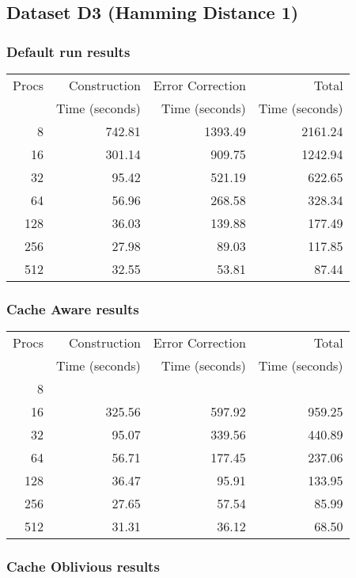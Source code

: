 \documentclass[integrals, nointegrals, article, 12pt, a4paper]{article}
\begin{document}
\subsection{Dataset D3 (Hamming Distance 1)}
\label{sec-3-4}
\subsubsection{Default run results}
\label{sec-3-4-1}

\begin{center}
\begin{tabular}{rrrr}
\hline
Procs & Construction & Error Correction & Total\\
 & Time (seconds) & Time (seconds) & Time (seconds)\\
\hline
8 & 742.81 & 1393.49 & 2161.24\\
16 & 301.14 & 909.75 & 1242.94\\
32 & 95.42 & 521.19 & 622.65\\
64 & 56.96 & 268.58 & 328.34\\
128 & 36.03 & 139.88 & 177.49\\
256 & 27.98 & 89.03 & 117.85\\
512 & 32.55 & 53.81 & 87.44\\
\hline
\end{tabular}
\end{center}
\subsubsection{Cache Aware results}
\label{sec-3-4-2}

\begin{center}
\begin{tabular}{rrrr}
\hline
Procs & Construction & Error Correction & Total\\
 & Time (seconds) & Time (seconds) & Time (seconds)\\
\hline
8 &  &  & \\
16 & 325.56 & 597.92 & 959.25\\
32 & 95.07 & 339.56 & 440.89\\
64 & 56.71 & 177.45 & 237.06\\
128 & 36.47 & 95.91 & 133.95\\
256 & 27.65 & 57.54 & 85.99\\
512 & 31.31 & 36.12 & 68.50\\
\hline
\end{tabular}
\end{center}
\subsubsection{Cache Oblivious results}
\label{sec-3-4-3}
\end{document}
